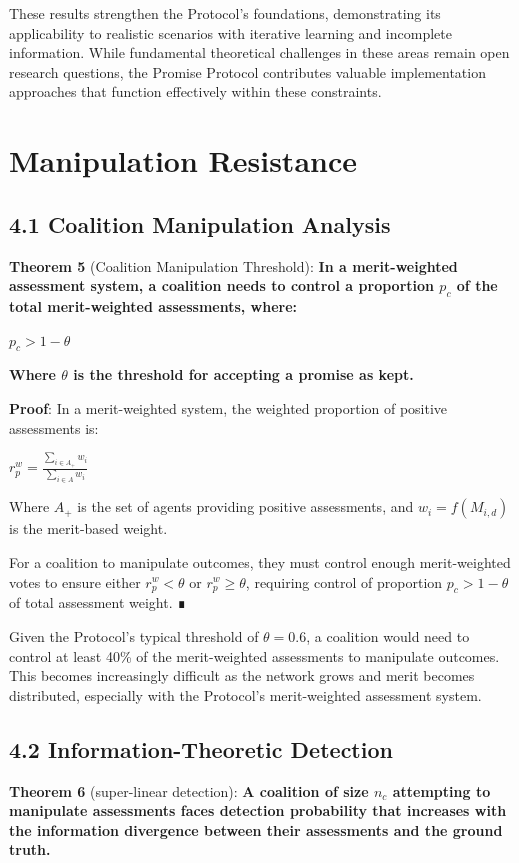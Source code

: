 \documentclass[11pt]{article}
\begin{document}
These results strengthen the Protocol's foundations, demonstrating its applicability to realistic scenarios with iterative learning and incomplete information. While fundamental theoretical challenges in these areas remain open research questions, the Promise Protocol contributes valuable implementation approaches that function effectively within these constraints.
\section{Manipulation Resistance}
\label{sec:org5bb44bd}
\subsection{4.1 Coalition Manipulation Analysis}
\label{sec:org54e2703}
\textbf{Theorem 5} (Coalition Manipulation Threshold): \textbf{In a merit-weighted assessment system, a coalition needs to control a proportion \(p_c\) of the total merit-weighted assessments, where:}

\(p_c > 1 - \theta\)

\textbf{Where \(\theta\) is the threshold for accepting a promise as kept.}

\textbf{Proof}:
In a merit-weighted system, the weighted proportion of positive assessments is:

\(r_p^w = \frac{\sum_{i \in A_+} w_i}{\sum_{i \in A} w_i}\)

Where \(A_+\) is the set of agents providing positive assessments, and \(w_i = f(M_{i,d})\) is the merit-based weight.

For a coalition to manipulate outcomes, they must control enough merit-weighted votes to ensure either \(r_p^w < \theta\) or \(r_p^w \geq \theta\), requiring control of proportion \(p_c > 1 - \theta\) of total assessment weight. ∎

Given the Protocol's typical threshold of \(\theta = 0.6\), a coalition would need to control at least 40\% of the merit-weighted assessments to manipulate outcomes. This becomes increasingly difficult as the network grows and merit becomes distributed, especially with the Protocol's merit-weighted assessment system.
\subsection{4.2 Information-Theoretic Detection}
\label{sec:org75b3058}
\textbf{Theorem 6} (super-linear detection): \textbf{A coalition of size \(n_c\) attempting to manipulate assessments faces detection probability that increases with the information divergence between their assessments and the ground truth.}
\end{document}
